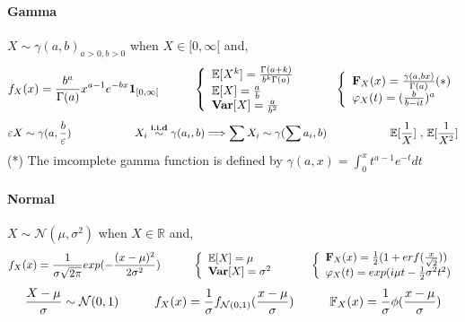 \documentclass[a4paper,10pt]{article}
\begin{document}
\paragraph{Gamma} $X\sim \gamma(a,b)_{a>0,b>0}$ when $X \in [0,\infty[$ and,
\[
f_{X}(x) = \frac{b^a}{\Gamma(a)} x^{a-1} e^{-bx} \mathbf{1}_{[0,\infty[}
\hspace{10mm}
\left\{
\begin{array}{l}
\mathbb{E}[X^k]=\frac{\Gamma(a+k)}{b^k\Gamma(a)} \\
\mathbb{E}[X]=\frac{a}{b} \\
\textbf{Var}[X]=\frac{a}{b^2} 
\end{array}\right.
\hspace{10mm}
\left\{
\begin{array}{l}
\textbf{F}_X(x) = \frac{\gamma(a,bx)}{\Gamma(a)} (*)  \\
\varphi_{X}(t) = (\frac{b}{b - it})^a
\end{array}\right.
\]
\[
\varepsilon X \sim \gamma(a,\frac{b}{\varepsilon})
\hspace{20mm}
X_i \stackrel{\textbf{i.i.d}}{\sim} \gamma(a_i,b) \Longrightarrow \sum X_i \sim \gamma(\sum a_i, b)
\hspace{20mm}
\mathbb{E}[\frac{1}{X}] \text{ , } \mathbb{E}[\frac{1}{X^2}]
\]
(*) The imcomplete gamma function is defined by $\gamma(a,x) = \int_{0}^{x} t^{a-1}e^{-t}dt $

\paragraph{Normal} $X \sim \mathcal{N}(\mu,\sigma^2)$ when $X \in \mathbb{R}$ and,
\[
f_{X}(x) = \frac{1}{\sigma \sqrt{2\pi}} exp (-\frac{(x-\mu)^2}{2\sigma^2})
\hspace{10mm}
\left\{
\begin{array}{l}
\mathbb{E}[X]=\mu \\
\textbf{Var}[X]=\sigma^2
\end{array}\right.
\hspace{10mm}
\left\{
\begin{array}{l}
\textbf{F}_X(x) =  \frac{1}{2}(1+erf(\frac{x}{\sqrt{2}})) \\
\varphi_{X}(t) = exp(i\mu t - \frac{1}{2}\sigma^2 t^2)
\end{array}\right.
\]
\[
\frac{X - \mu}{\sigma} \sim \mathcal{N}(0,1)
\hspace{10mm}
f_{X}(x) = \frac{1}{\sigma}f_{\mathcal{N}(0,1)}(\frac{x-\mu}{\sigma})
\hspace{10mm}
\mathbb{F}_{X}(x) = \frac{1}{\sigma}\phi(\frac{x-\mu}{\sigma})
\]
\end{document}
